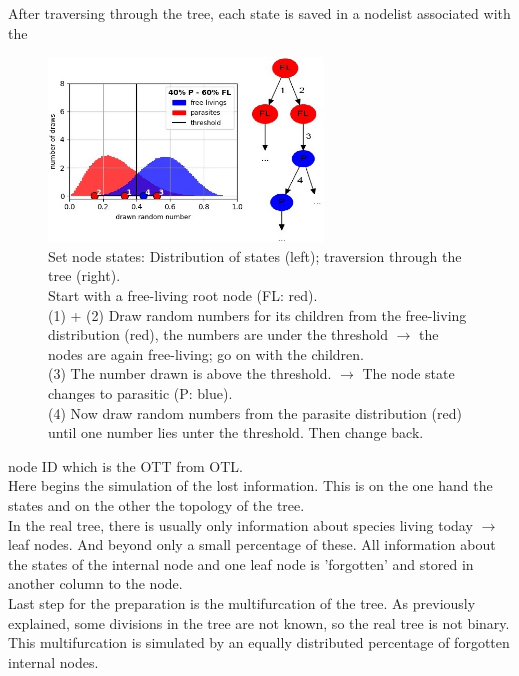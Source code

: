     After traversing through the tree, each state is saved in a nodelist associated with the  
    \begin{figure}
      \centering
      \includegraphics[width=0.65\textwidth]{Figures/40-60_all.jpg}
      \caption{Set node states: Distribution of states (left); traversion through the tree (right). \\
        Start with a free-living root node (FL: red). \\
        (1) + (2) Draw random numbers for its children from the free-living distribution (red), the numbers are under the threshold 
        $\rightarrow$ the nodes are again free-living; go on with the children. \\
        (3) The number drawn is above the threshold. $\rightarrow$ The node state changes to parasitic (P: blue). \\
        (4) Now draw random numbers from the parasite distribution (red) until one number lies unter the threshold. Then change back.}
      \label{fig:set node states}
    \end{figure}
    node ID which is the OTT from OTL. \\

    Here begins the simulation of the lost information. This is on the one hand the states and on the 
      other the topology of the tree. \\

    In the real tree, there is usually only information about species living today $\rightarrow$ leaf 
      nodes. And beyond only a small percentage of these. All information about the states of the 
      internal node and one leaf node is 'forgotten' and stored in another column to the node. \\

    Last step for the preparation is the multifurcation of the tree. As previously explained, some 
      divisions in the tree are not known, so the real tree is not binary. This multifurcation is 
      simulated by an equally distributed percentage of forgotten internal nodes. \\
    
